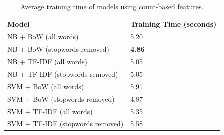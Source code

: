 \documentclass[a4paper,twoside,phd]{BYUPhys}
\begin{document}
\begin{table}[H]
	\centering
	\caption{Average training time of models using count-based features.}
	\begin{tabular}{|p{4.2cm}|p{5cm}|}
		\hline
		
		\textbf{Model} & \textbf{Training Time (seconds)}                                                                                                                                                                                                                                                                                                                                                    \\
		\hline                                                                                                                                              
		
		NB + BoW (all words)  & 5.20  \\
		\hline
		
		NB + BoW \newline (stopwords  removed)  & \textbf{4.86}  \\
		\hline
		
		NB + TF-IDF \newline (all words) & 5.05 \\
		\hline
		
		NB + TF-IDF \newline (stopwords removed) & 5.05 \\
		\hline
		
		SVM + BoW  \newline (all words)  & 5.91  \\
		\hline
		
		SVM + BoW \newline (stopwords removed)  & 4.87  \\
		\hline
		
		SVM + TF-IDF \newline (all words) & 5.35 \\
		\hline
		
		SVM + TF-IDF \newline (stopwords removed) & 5.58 \\
		\hline                                                                                                                                           
		
	\end{tabular}
	\label{table:CountTrainingTime}
\end{table}
\end{document}
